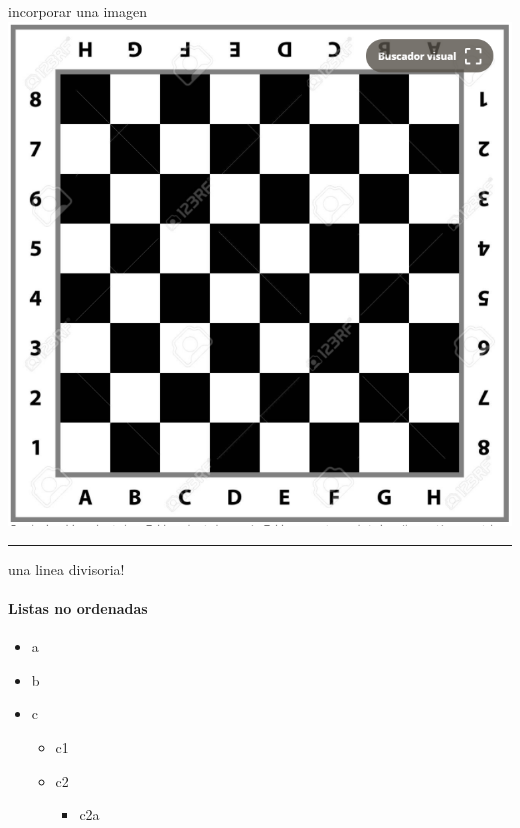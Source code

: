 \documentclass[
]{article}
\providecommand{\tightlist}{%
  \setlength{\itemsep}{0pt}\setlength{\parskip}{0pt}}
\begin{document}
incorporar una imagen \includegraphics{tableroajedres.png}

\begin{center}\rule{0.5\linewidth}{0.5pt}\end{center}

una linea divisoria!

\hypertarget{listas-no-ordenadas}{%
\paragraph{Listas no ordenadas}\label{listas-no-ordenadas}}

\begin{itemize}
\tightlist
\item
  a
\item
  b
\item
  c

  \begin{itemize}
  \tightlist
  \item
    c1
  \item
    c2

    \begin{itemize}
    \tightlist
    \item
      c2a
    \end{itemize}
  \end{itemize}
\end{itemize}
\end{document}
